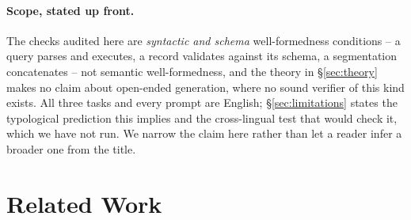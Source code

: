 \documentclass[11pt]{article}
\begin{document}
\paragraph{Scope, stated up front.} The checks audited here are
\emph{syntactic and schema} well-formedness conditions -- a query parses
and executes, a record validates against its schema, a segmentation
concatenates -- not semantic well-formedness, and the theory in
\S\ref{sec:theory} makes no claim about open-ended generation, where no
sound verifier of this kind exists. All three tasks and every prompt are
English; \S\ref{sec:limitations} states the typological prediction this
implies and the cross-lingual test that would check it, which we have not
run. We narrow the claim here rather than let a reader infer a broader
one from the title.

\section{Related Work}\label{sec:related}
\end{document}
